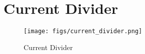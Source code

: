 \documentclass[main]{subfiles}
\begin{document}
\section{Current Divider}
\begin{figure}[htbp]
  \centering
  \texttt{[image: figs/current\_divider.png]}
  \caption{Current Divider \cite{lec6}}
  \label{fig:current_divider}
\end{figure}

\end{document}
